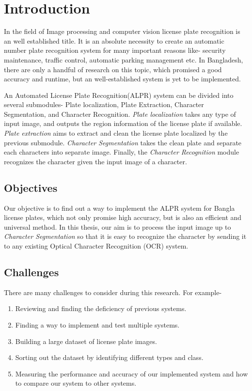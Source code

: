 \documentclass{standalone}
\begin{document}
\chapter{Introduction}
In the field of Image processing and computer vision license plate recognition is an well established title. It is an absolute necessity to create an automatic number plate recognition system for many important reasons like- security maintenance, traffic control, automatic parking management etc. In Bangladesh, there are only a handful of research on this topic, which promised a good accuracy and runtime, but an well-established system is yet to be implemented.

An Automated License Plate Recognition(ALPR) system can be divided into several submodules- Plate localization, Plate Extraction, Character Segmentation, and Character Recognition. {\it Plate localization} takes any type of input image, and outputs the region information of the license plate if available. {\it Plate extraction} aims to extract and clean the license plate localized by the previous submodule. {\it Character Segmentation} takes the clean plate and separate each characters into separate image. Finally, the {\it Character Recognition} module recognizes the character given the input image of a character. 



\section{Objectives}
Our objective is to find out a way to implement the ALPR system for Bangla license plates, which not only promise high accuracy, but is also an efficient and universal method. In this thesis, our aim is to process the input image up to {\it Character Segmentation} so that it is easy to recognize the character by sending it to any existing Optical Character Recognition (OCR) system.



\section{Challenges}
There are many challenges to consider during this research. For example-

\begin{enumerate}
	\item Reviewing and finding the deficiency of previous systems.
	\item Finding a way to implement and test multiple systems.
    \item Building a large dataset of license plate images.
    \item Sorting out the dataset by identifying different types and class.
    \item Measuring the performance and accuracy of our implemented system and how to compare our system to other systems.
\end{enumerate}
    
\end{document}
